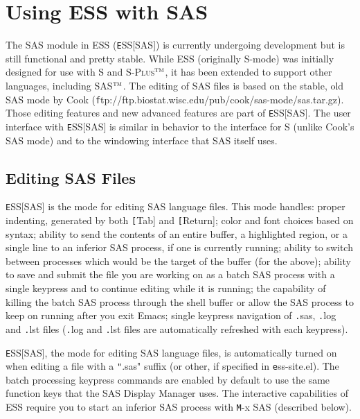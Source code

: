 \documentclass{article}
\newcommand*{\Splus}{\textsc{S-Plus}}
\newcommand{\tm}{$^{\mbox{\scriptsize\sc tm}}$}
\begin{document}
\section{Using ESS with SAS}
\label{sec:SAS}

The SAS module in ESS ({\texttt ESS[SAS]}) is currently undergoing
development but is still functional and pretty stable.  While ESS
(originally S-mode) was initially designed for use with S and
\Splus\tm, it has been extended to support other languages, including
SAS\tm.  The editing of SAS files is based on the stable, old SAS mode
by Cook ({\texttt
  ftp://ftp.biostat.wisc.edu/pub/cook/sas-mode/sas.tar.gz}).  Those
editing features and new advanced features are part of {\texttt ESS[SAS]}.
The user interface with {\texttt ESS[SAS]} is similar in behavior to the
interface for S (unlike Cook's SAS mode) and to the windowing
interface that SAS itself uses.

\subsection{Editing SAS Files}
\label{sec:SAS:edit}

{\texttt ESS[SAS]} is the mode for editing SAS language files.  This mode
handles: proper indenting, generated by both {\texttt [Tab]} and {\texttt
  [Return]}; color and font choices based on syntax; ability to send
the contents of an entire buffer, a highlighted region, or a single
line to an inferior SAS process, if one is currently running; ability
to switch between processes which would be the target of the buffer
(for the above); ability to save and submit the file you are working
on as a batch SAS process with a single keypress and to continue
editing while it is running; the capability of killing the batch SAS
process through the shell buffer or allow the SAS process to keep on
running after you exit Emacs; single keypress navigation of {\texttt
  .sas}, {\texttt .log} and {\texttt .lst} files ({\texttt .log} and {\texttt .lst}
files are automatically refreshed with each keypress).

{\texttt ESS[SAS]}, the mode for editing SAS language files, is automatically
turned on when editing a file with a {\texttt ".sas"} suffix (or other, if
specified in {\texttt ess-site.el}).  The batch processing keypress commands are
enabled by default to use the same function keys that the SAS Display
Manager uses.  The interactive capabilities of ESS require you to
start an inferior SAS process with {\texttt M-x SAS} (described below).
\end{document}

